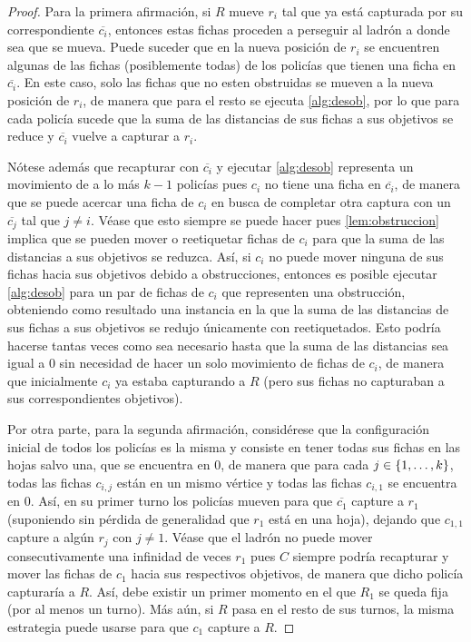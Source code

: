 \begin{proof}
    Para la primera afirmaci\'on, si $R$ mueve $r_i$ tal que ya est\'a capturada
    por su correspondiente $\overline{c_i}$, entonces estas fichas proceden a
    perseguir al ladr\'on a donde sea que se mueva. Puede suceder que en la
    nueva posici\'on de $r_i$ se encuentren algunas de las fichas (posiblemente
    todas) de los polic\'ias que tienen una ficha en $\overline{c_i}$. En este
    caso, solo las fichas que no esten obstruidas se mueven a la nueva
    posici\'on de $r_i$, de manera que para el resto se ejecuta
    \cref{alg:desob}, por lo que para cada polic\'ia sucede que la suma de las
    distancias de sus fichas a sus objetivos se reduce y $\overline{c_i}$ vuelve
    a capturar a $r_i$.
    
    N\'otese adem\'as que recapturar con $\overline{c_i}$ y ejecutar
    \cref{alg:desob} representa un movimiento de a lo m\'as $k-1$ polic\'ias
    pues $c_i$ no tiene una ficha en $\overline{c_i}$, de manera que se puede
    acercar una ficha de $c_i$ en busca de completar otra captura con un
    $\overline{c_j}$ tal que $j\neq i$. V\'ease que esto siempre se puede hacer
    pues \cref{lem:obstruccion} implica que se pueden mover o reetiquetar fichas
    de $c_i$ para que la suma de las distancias a sus objetivos se reduzca.
    As\'i, si $c_i$ no puede mover ninguna de sus fichas hacia sus objetivos
    debido a obstrucciones, entonces es posible ejecutar \cref{alg:desob} para
    un par de fichas de $c_i$ que representen una obstrucci\'on, obteniendo como
    resultado una instancia en la que la suma de las distancias de sus fichas a
    sus objetivos se redujo \'unicamente con reetiquetados. Esto podr\'ia
    hacerse tantas veces como sea necesario hasta que la suma de las distancias
    sea igual a $0$ sin necesidad de hacer un solo movimiento de fichas de
    $c_i$, de manera que inicialmente $c_i$ ya estaba capturando a $R$ (pero sus
    fichas no capturaban a sus correspondientes objetivos).
    
    Por otra parte, para la segunda afirmaci\'on, consid\'erese que la
    configuraci\'on inicial de todos los polic\'ias es la misma y consiste en
    tener todas sus fichas en las hojas salvo una, que se encuentra en $0$, de
    manera que para cada $j\in \{1,\dots, k\}$, todas las fichas $c_{i,j}$ est\'an
    en un mismo v\'ertice y todas las fichas $c_{i,1}$ se encuentra en $0$.
    As\'i, en su primer turno los polic\'ias mueven para que $\overline{c_1}$
    capture a $r_1$ (suponiendo sin p\'erdida de generalidad que $r_1$ est\'a en
    una hoja), dejando que $c_{1,1}$ capture a alg\'un $r_j$ con $j\neq 1$.
    V\'ease que el ladr\'on no puede mover consecutivamente una infinidad de
    veces $r_1$ pues $C$ siempre podr\'ia recapturar y mover las fichas de $c_1$
    hacia sus respectivos objetivos, de manera que dicho polic\'ia capturar\'ia
    a $R$. As\'i, debe existir un primer momento en el que $R_1$ se queda fija
    (por al menos un turno). M\'as a\'un, si $R$ pasa en el resto de sus turnos,
    la misma estrategia puede usarse para que $c_1$ capture a $R$.


\end{proof}
